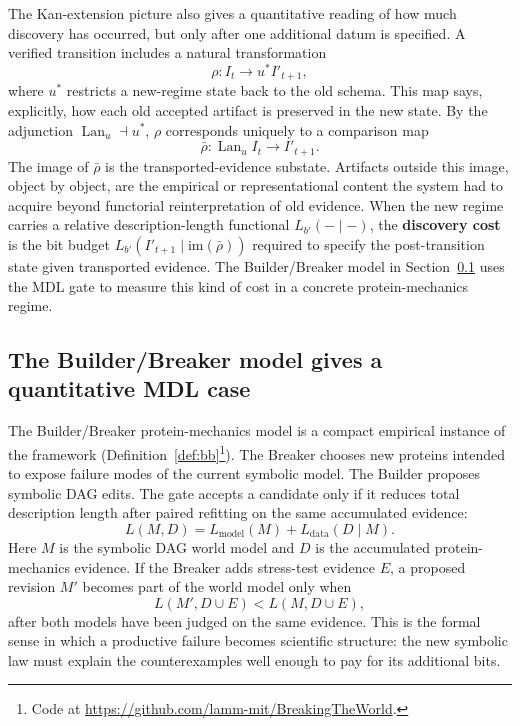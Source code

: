 \documentclass[11pt]{article}
\theoremstyle{definition}
\newcommand{\Lan}{\operatorname{Lan}}
\begin{document}
The Kan-extension picture also gives a quantitative reading of how much discovery has occurred, but only after one additional datum is specified. A verified transition includes a natural transformation
\[
\rho:I_t\longrightarrow u^* I'_{t+1},
\]
where $u^*$ restricts a new-regime state back to the old schema. This map says, explicitly, how each old accepted artifact is preserved in the new state. By the adjunction $\Lan_u\dashv u^*$, $\rho$ corresponds uniquely to a comparison map
\[
\bar\rho:\Lan_u I_t\longrightarrow I'_{t+1}.
\]
The image of $\bar\rho$ is the transported-evidence substate. Artifacts outside this image, object by object, are the empirical or representational content the system had to acquire beyond functorial reinterpretation of old evidence. When the new regime carries a relative description-length functional $L_{b'}(-\mid-)$, the \textbf{discovery cost} is the bit budget $L_{b'}(I'_{t+1}\mid\mathrm{im}(\bar\rho))$ required to specify the post-transition state given transported evidence. The Builder/Breaker model in Section~\ref{sec:builder_breaker_results} uses the MDL gate to measure this kind of cost in a concrete protein-mechanics regime.

\subsection{The Builder/Breaker model gives a quantitative MDL case}
\label{sec:builder_breaker_results}

The Builder/Breaker protein-mechanics model is a compact empirical instance of the framework \citep{buehler_break_world_2026} (Definition~\ref{def:bb}\footnote{Code at \url{https://github.com/lamm-mit/BreakingTheWorld}.}). The Breaker chooses new proteins intended to expose failure modes of the current symbolic model. The Builder proposes symbolic DAG edits. The gate accepts a candidate only if it reduces total description length after paired refitting on the same accumulated evidence:
\begin{equation}
L(M,D)=L_{\mathrm{model}}(M)+L_{\mathrm{data}}(D\mid M).
\label{eq:case_mdl_results}
\end{equation}
Here $M$ is the symbolic DAG world model and $D$ is the accumulated protein-mechanics evidence. If the Breaker adds stress-test evidence $E$, a proposed revision $M'$ becomes part of the world model only when
\[
L(M',D\cup E)<L(M,D\cup E),
\]
after both models have been judged on the same evidence. This is the formal sense in which a productive failure becomes scientific structure: the new symbolic law must explain the counterexamples well enough to pay for its additional bits.
\end{document}
